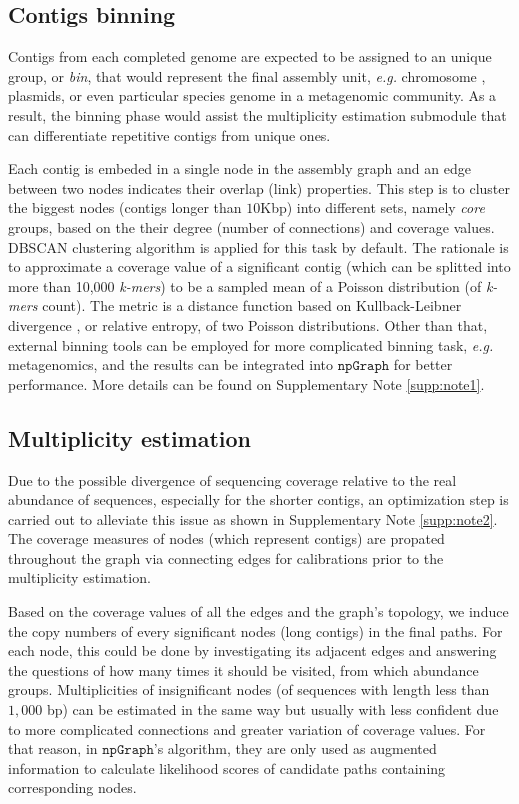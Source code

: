 \documentclass[10pt,twocolumn,twoside]{genpaper}
\newcommand{\npgraph}{$\mathtt{npGraph}$}
\newcommand{\EG}{\emph{e.g.}}
\begin{document}
\subsection*{Contigs binning}
Contigs from each completed genome are expected to be assigned to an unique group, or \emph{bin}, that would represent the final assembly unit, \EG{} chromosome , plasmids, or even particular species genome in a metagenomic community. As a result, the binning phase would assist the multiplicity estimation submodule that can differentiate repetitive contigs from unique ones. 

Each contig is embeded in a single node in the assembly graph and an edge between two nodes indicates their overlap (link) properties.
This step is to cluster the biggest nodes (contigs longer than $10$Kbp) into different sets, namely \emph{core} groups, based on the their degree (number of connections) and coverage values.
DBSCAN clustering algorithm \cite{Ester96adensity-based} is applied for this task by default.
The rationale is to approximate a coverage value of a significant contig (which can be splitted into more than 10,000 \emph{k-mers}) to be a sampled mean of a Poisson distribution (of \emph{k-mers} count). 
The metric is a distance function based on Kullback-Leibner divergence \cite{Kullback1951information}, or relative entropy, of two Poisson distributions. Other than that, external binning tools can be employed for more complicated binning task, \EG{} metagenomics, and the results can be integrated into \npgraph{} for better performance. More details can be found on Supplementary Note \ref{supp:note1}.

\subsection*{Multiplicity estimation}
Due to the possible divergence of sequencing coverage relative to the real abundance of sequences, especially for the shorter contigs, an optimization step is carried out to alleviate this issue as shown in Supplementary Note \ref{supp:note2}. The coverage measures of nodes (which represent contigs) are propated throughout the graph via connecting edges for calibrations prior to the multiplicity estimation. 

Based on the coverage values of all the edges and the graph's topology, we induce the copy numbers of every significant nodes (long contigs) in the final paths.
For each node, this could be done by investigating its adjacent edges and answering the questions of how many times it should be visited, from which abundance groups.
Multiplicities of insignificant nodes (of sequences with length less than $1,000$ bp) can be estimated in the same way but usually with less confident due to more complicated connections and greater variation of coverage values. 
For that reason, in \npgraph{}'s algorithm, they are only used as augmented information to calculate likelihood scores of candidate paths containing corresponding nodes.
\end{document}
